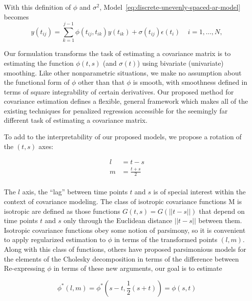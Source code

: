 \documentclass[12pt]{article}
\theoremstyle{definition}
\begin{document}
{{{{With this definition of $\phi$ and $\sigma^2$, Model~\ref{eq:discrete-unevenly-spaced-ar-model} becomes
\begin{equation}   
y\left(t_{ij} \right)  = \sum_{k=1}^{j-1} \phi\left(t_{ij} ,t_{ik}\right) y\left(t_{ik}\right) + \sigma\left(t_{ij}\right)\epsilon\left({t_i}\right) \;\;\;\; i=1,\dots, N, 
\label{eq:MyModel} 
\end{equation}

Our formulation transforms the task of estimating a covariance matrix is to estimating the function $\phi\left(t,s\right)$ (and $\sigma\left(t \right)$) using bivariate (univariate) smoothing. Like other nonparametric situations, we make no assumption about the functional form of $\phi$ other than that $\phi$ is smooth, with smoothness defined in terms of square integrability of certain derivatives. Our proposed method for covariance estimation defines a flexible, general framework which makes all of the existing techniques for penalized regression accessible for the seemingly far different task of estimating a covariance matrix.

\bigskip

To add to the interpretability of our proposed models, we propose a rotation of the $\left( t,s \right)$ axes: 

\begin{align*}
l &= t - s \\
m &= \frac{t + s}{2} \\
\end{align*}

The $l$ axis, the ``lag'' between time points $t$ and $s$ is of special interest within the context of covariance modeling. The class of isotropic covariance functions M is isotropic are defined as those functions $G\left(t,s\right) = G\left(\vert \vert t-s \vert \vert \right)$ that depend on time points $t$ and $s$ only through the Euclidean distance $\vert \vert t-s \vert \vert$ between them. Isotropic covariance functions obey some notion of parsimony, so it is convenient to apply regularized estimation to $\phi$ in terms of the transformed points $\left(l, m\right)$. Along with this class of functions, others have proposed parsimonious models for the elements of the Cholesky decomposition in terms of the difference between Re-expressing $\phi$ in terms of these new arguments, our goal is to estimate

\begin{equation}
\phi^*\left(l,m\right) = \phi^*\left(s-t, \frac{1}{2}\left(s+t\right)\right) = \phi\left(s,t\right)
\end{equation}

}}}}
\end{document}
